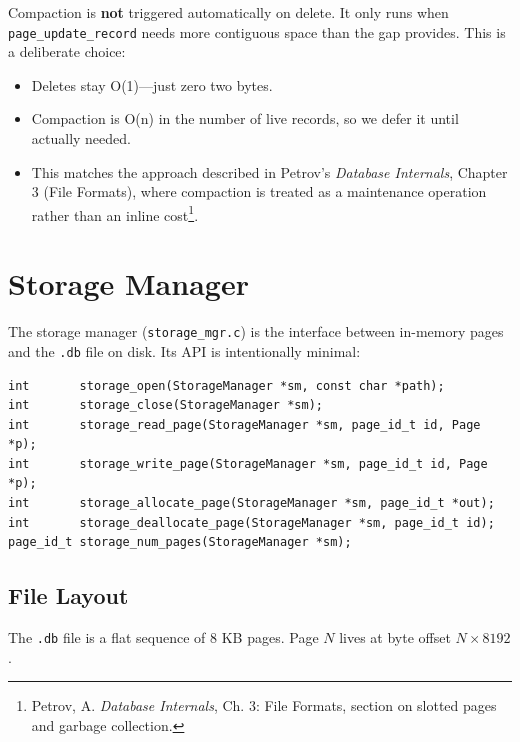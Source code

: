 \documentclass[12pt, a4paper]{report}
\begin{document}
Compaction is \textbf{not} triggered automatically on delete. It only runs
when \texttt{page\_update\_record} needs more contiguous space than the gap
provides. This is a deliberate choice:

\begin{itemize}[itemsep=2pt]
    \item Deletes stay O(1)---just zero two bytes.
    \item Compaction is O(n) in the number of live records, so we defer it
          until actually needed.
    \item This matches the approach described in Petrov's \textit{Database
          Internals}, Chapter 3 (File Formats), where compaction is treated as
          a maintenance operation rather than an inline cost\footnote{Petrov,
          A. \textit{Database Internals}, Ch. 3: File Formats, section on
          slotted pages and garbage collection.}.
\end{itemize}


\section{Storage Manager}

The storage manager (\texttt{storage\_mgr.c}) is the interface between
in-memory pages and the \texttt{.db} file on disk. Its API is intentionally
minimal:

\begin{lstlisting}
int       storage_open(StorageManager *sm, const char *path);
int       storage_close(StorageManager *sm);
int       storage_read_page(StorageManager *sm, page_id_t id, Page *p);
int       storage_write_page(StorageManager *sm, page_id_t id, Page *p);
int       storage_allocate_page(StorageManager *sm, page_id_t *out);
int       storage_deallocate_page(StorageManager *sm, page_id_t id);
page_id_t storage_num_pages(StorageManager *sm);
\end{lstlisting}


\subsection{File Layout}

The \texttt{.db} file is a flat sequence of 8 KB pages. Page $N$ lives at
byte offset $N \times 8192$.
\end{document}
